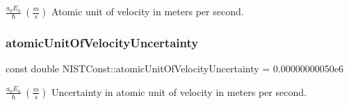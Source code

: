 $\frac{a_0 E_h}{\hbar} \ (\frac{m}{s})$ Atomic unit of velocity in meters per second. \mbox{\label{group___atomic_unit_ga519034dfac791b4fd441640dd6859c2e}} 
\subsubsection{\texorpdfstring{atomic\+Unit\+Of\+Velocity\+Uncertainty}{atomicUnitOfVelocityUncertainty}}
{\footnotesize\ttfamily const double N\+I\+S\+T\+Const\+::atomic\+Unit\+Of\+Velocity\+Uncertainty = 0.\+00000000050e6}

$\frac{a_0 E_h}{\hbar} \ (\frac{m}{s})$ Uncertainty in atomic unit of velocity in meters per second. 